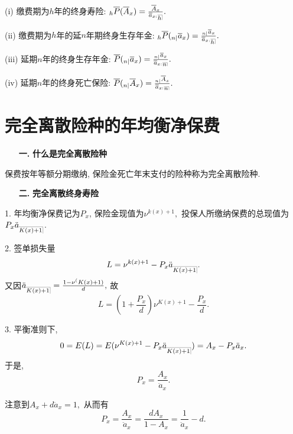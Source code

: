 \documentclass[a4paper,openany, 10pt]{ctexbook}
\makeatletter
\newcommand{\hei}{\CJKfamily{hei}}      %
\def\z{\left}
\def\y{\right}
\DeclareRobustCommand{\annu}[1]{_{%
    \def\arraystretch{0}%
    \setlength\arraycolsep{1pt}%
    \setlength\arrayrulewidth{.2pt}%
    \begin{array}[b]{@{}c|}\hline
        \\[\arraycolsep]%
        \scriptstyle #1%
    \end{array}%
}}
\makeatother
\begin{document}
(i) 缴费期为$h$年的终身寿险: $_{h}\overline{P}(\overline{A}_{x})=\frac{\overline{A}_{x}}{\overline{a}_{x:}{}\annu h}.$

(ii) 缴费期为$h$年的延$n$年期终身生存年金: $_{h}\overline{P}(_{n|}\overline{a}_{x})=\frac{_{n|}\overline{a}_{x}}{\overline{a}_{x:}{}{\annu h}}.$

(iii) 延期$n$年的终身生存年金: $\overline{P}(_{n|}\overline{a}_{x})=\frac{_{n|}\overline{a}_{x}}{\overline{a}_{x:}{}\annu n}.$

(iv) 延期$n$年的终身死亡保险: $\overline{P}(_{n|}\overline{A}_{x})=\frac{_{n|}\overline{A}_{x}}{\overline{a}_{x:}{}\annu n}.$

\section{完全离散险种的年均衡净保费}
\begin{itemize}
    \item[{\bf\hei 一.}]{\bf\hei 什么是完全离散险种}
\end{itemize}
保费按年等额分期缴纳, 保险金死亡年末支付的险种称为完全离散险种.

\begin{itemize}
    \item[{\bf\hei 二.}]{\bf\hei 完全离散终身寿险}
\end{itemize}

1. 年均衡净保费记为$P_{x}$, 保险金现值为$\nu^{k(x)+1},$
投保人所缴纳保费的总现值为$P_{x}\ddot{a}_{\annu{K(x)+1}}$.

2. 签单损失量
$$L=\nu^{k(x)+1}-P_{x}\ddot{a}_{\annu{K(x)+1}}.$$
又因$\ddot{a}_{\annu{K(x)+1}}=\frac{1-\nu^(K(x)+1)}{d},$ 故
$$L = \z(1+\frac{P_{x}}{d}\y)\nu^{K(x)+1}-\frac{P_{x}}{d}.$$

3. 平衡准则下, $$0=E(L)=E(\nu^{K(x)+1}-P_{x}\ddot{a}_{\annu{K(x)+1}})=A_{x}-P_{x}\ddot{a}_{x}. $$
于是,
$$P_{x}=\frac{A_{x}}{\ddot{a}_{x}}.$$

注意到$A_{x}+d\ddot{a}_{x}=1,$ 从而有$$P_{x}=\frac{A_{x}}{\ddot{a}_{x}}=\frac{dA_{x}}{1-A_{x}}=\frac{1}{\ddot{a}_{x}}-d.$$
\end{document}
